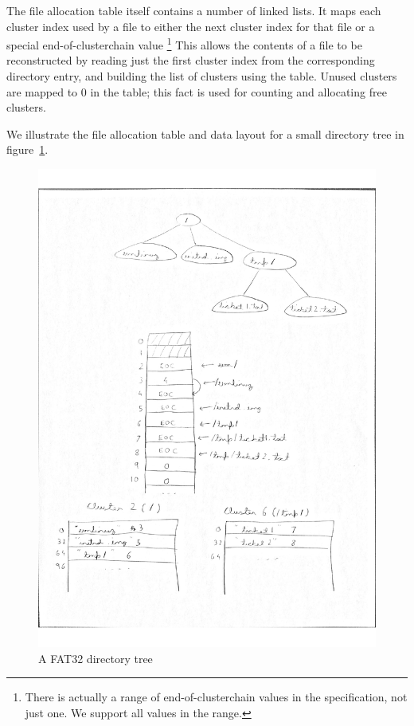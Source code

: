 \documentclass[submission,copyright,creativecommons]{eptcs}
\begin{document}
The file allocation table itself contains a number of linked lists. It
maps each cluster index used by a file to either the next cluster
index for that file or a special end-of-clusterchain value \footnote{
There is actually a range of end-of-clusterchain values in the
specification, not just one. We support all values in the range.} This
allows the contents of a file to be reconstructed by
reading just the first cluster index from the corresponding directory
entry, and building the list of clusters using the table. Unused
clusters are mapped to 0 in the table; this fact is used for counting
and allocating free clusters.

We illustrate the file allocation table and data layout for a small
directory tree in figure~\ref{fat32-example}.

\begin{figure}
  \caption{A FAT32 directory tree}
  \label{fat32-example}
  \includegraphics[page=1,width=1.10\textwidth]{fat32-diagram.pdf}
\end{figure}
\end{document}
